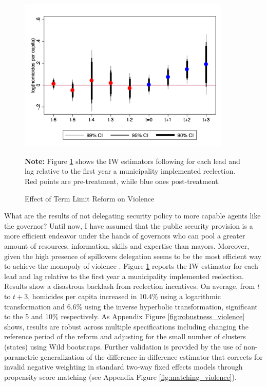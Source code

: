 \documentclass[12pt]{amsart}
\numberwithin{equation}{section}
\theoremstyle{definition}
\theoremstyle{definition}
\theoremstyle{definition}
\begin{document}
\begin{figure}[h] 
\centering
 \caption{Effect of Term Limit Reform on Violence}
 \label{fig:as_violence}
\includegraphics[width=0.9\textwidth]{Figures/catts_homicides.png}
       \captionsetup{justification=centering}
       
 \textbf{Note:} Figure \ref{fig:as_violence} shows the IW estimators following \citet{abraham_sun_2020} for each lead and lag relative to the first year a municipality implemented reelection. Red points are pre-treatment, while blue ones post-treatment. 
    
\end{figure}    
     

What are the results of not delegating security policy to more capable agents like the governor? Until now, I have assumed that the public security provision is a more efficient endeavor under the hands of governors who can pool a greater amount of resources, information, skills and expertise than mayors. Moreover, given the high presence of spillovers delegation seems to be the most efficient way to achieve the monopoly of violence \citep{oates_1972}. Figure \ref{fig:as_violence} reports the IW estimator for each lead and lag relative to the first year a municipality implemented reelection. Results show a disastrous backlash from reelection incentives. On average, from $t$ to $t+3$, homicides per capita increased in 10.4\% using a logarithmic transformation and 6.6\% using the inverse hyperbolic transformation, significant to the 5 and 10\% respectively. As Appendix Figure \ref{fig:robustness_violence} shows, results are robust across multiple specifications including changing the reference period of the reform and adjusting for the small number of clusters (states) using Wild bootstraps. Further validation is provided by the use of \citet{imai_etal_2020} non-parametric generalization of the difference-in-difference estimator that corrects for invalid negative weighting in standard two-way fixed effects models through propensity score matching (see Appendix Figure \ref{fig:matching_violence}). 
\end{document}
